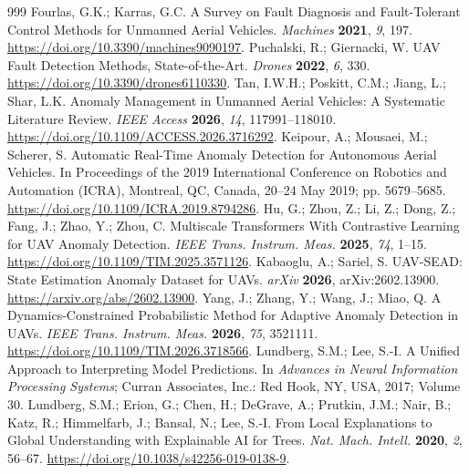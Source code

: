 \documentclass[drones,article,submit,moreauthors]{Definitions/mdpi}
\begin{document}
\begin{thebibliography}{999}
 Fourlas, G.K.; Karras, G.C. A Survey on Fault Diagnosis and Fault-Tolerant Control Methods for Unmanned Aerial Vehicles. \textit{Machines} \textbf{2021}, \textit{9}, 197. \href{https://doi.org/10.3390/machines9090197}{https://doi.org/10.3390/machines9090197}.
 Puchalski, R.; Giernacki, W. UAV Fault Detection Methods, State-of-the-Art. \textit{Drones} \textbf{2022}, \textit{6}, 330. \href{https://doi.org/10.3390/drones6110330}{https://doi.org/10.3390/drones6110330}.
 Tan, I.W.H.; Poskitt, C.M.; Jiang, L.; Shar, L.K. Anomaly Management in Unmanned Aerial Vehicles: A Systematic Literature Review. \textit{IEEE Access} \textbf{2026}, \textit{14}, 117991--118010. \href{https://doi.org/10.1109/ACCESS.2026.3716292}{https://doi.org/10.1109/ACCESS.2026.3716292}.
 Keipour, A.; Mousaei, M.; Scherer, S. Automatic Real-Time Anomaly Detection for Autonomous Aerial Vehicles. In Proceedings of the 2019 International Conference on Robotics and Automation (ICRA), Montreal, QC, Canada, 20--24 May 2019; pp. 5679--5685. \href{https://doi.org/10.1109/ICRA.2019.8794286}{https://doi.org/10.1109/ICRA.2019.8794286}.
 Hu, G.; Zhou, Z.; Li, Z.; Dong, Z.; Fang, J.; Zhao, Y.; Zhou, C. Multiscale Transformers With Contrastive Learning for UAV Anomaly Detection. \textit{IEEE Trans. Instrum. Meas.} \textbf{2025}, \textit{74}, 1--15. \href{https://doi.org/10.1109/TIM.2025.3571126}{https://doi.org/10.1109/TIM.2025.3571126}.
 Kabaoglu, A.; Sariel, S. UAV-SEAD: State Estimation Anomaly Dataset for UAVs. \textit{arXiv} \textbf{2026}, arXiv:2602.13900. \href{https://arxiv.org/abs/2602.13900}{https://arxiv.org/abs/2602.13900}.
 Yang, J.; Zhang, Y.; Wang, J.; Miao, Q. A Dynamics-Constrained Probabilistic Method for Adaptive Anomaly Detection in UAVs. \textit{IEEE Trans. Instrum. Meas.} \textbf{2026}, \textit{75}, 3521111. \href{https://doi.org/10.1109/TIM.2026.3718566}{https://doi.org/10.1109/TIM.2026.3718566}.
 Lundberg, S.M.; Lee, S.-I. A Unified Approach to Interpreting Model Predictions. In \textit{Advances in Neural Information Processing Systems}; Curran Associates, Inc.: Red Hook, NY, USA, 2017; Volume 30.
 Lundberg, S.M.; Erion, G.; Chen, H.; DeGrave, A.; Prutkin, J.M.; Nair, B.; Katz, R.; Himmelfarb, J.; Bansal, N.; Lee, S.-I. From Local Explanations to Global Understanding with Explainable AI for Trees. \textit{Nat. Mach. Intell.} \textbf{2020}, \textit{2}, 56--67. \href{https://doi.org/10.1038/s42256-019-0138-9}{https://doi.org/10.1038/s42256-019-0138-9}.

\end{thebibliography}
\end{document}
